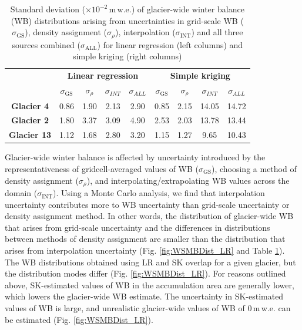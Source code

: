 \documentclass[twocolumn, letterpaper]{igs}
\begin{document}
\begin{table}[]
\centering
\caption{Standard deviation ($\times10^{-2}$\,m\,w.e.) of glacier-wide winter balance (WB) distributions arising from uncertainties in grid-scale WB ($\sigma_{\mathrm{GS}}$), density assignment ($\sigma_{\rho}$), interpolation ($\sigma_{\mathrm{INT}}$) and all three sources combined ($\sigma_{\mathrm{ALL}}$) for linear regression (left columns) and simple kriging (right columns)}
\label{tab:WSMBdistribution_sigma}
\begin{tabular}{c|cccc|cccc}
 & \multicolumn{4}{c|}{\textbf{Linear regression}} & \multicolumn{4}{c}{\textbf{Simple kriging}} \\
\textbf{} & $\sigma_{\mathrm{GS}}$ & $\sigma_{\rho}$ & $\sigma_{INT}$ & $\sigma_{ALL}$ & $\sigma_{\mathrm{GS}}$ & $\sigma_{\rho}$ & $\sigma_{INT}$ & $\sigma_{ALL}$ \\ \hline
\textbf{Glacier 4} & 0.86 & 1.90 & 2.13 & 2.90 & 0.85 & 2.15 & 14.05 & 14.72 \\
\textbf{Glacier 2} & 1.80 & 3.37 & 3.09 & 4.90 & 2.53 & 2.03 & 13.78 & 13.44 \\
\textbf{Glacier 13} & 1.12 & 1.68 & 2.80 & 3.20 & 1.15 & 1.27 & 9.65 & 10.43
\end{tabular}
\end{table}

Glacier-wide winter balance is affected by uncertainty introduced by the representativeness of gridcell-averaged values of WB ($\sigma_{\mathrm{GS}}$), choosing a method of density assignment ($\sigma_{\rho}$), and interpolating/extrapolating WB values across the domain ($\sigma_{\mathrm{INT}}$). Using a Monte Carlo analysis, we find that interpolation uncertainty contributes more to WB uncertainty than grid-scale uncertainty or density assignment method. In other words, the distribution of glacier-wide WB that arises from grid-scale uncertainty and the differences in distributions between methods of density assignment are smaller than the distribution that arises from interpolation uncertainty (Fig. \ref{fig:WSMBDist_LR} and Table \ref{tab:WSMBdistribution_sigma}). The WB distributions obtained using LR and SK overlap for a given glacier, but the distribution modes differ (Fig. \ref{fig:WSMBDist_LR}). For reasons outlined above, SK-estimated values of WB in the accumulation area are generally lower, which lowers the glacier-wide WB estimate.  The uncertainty in SK-estimated values of WB is large, and unrealistic glacier-wide values of WB of 0\,m\,w.e. can be estimated (Fig. \ref{fig:WSMBDist_LR}).
\end{document}
